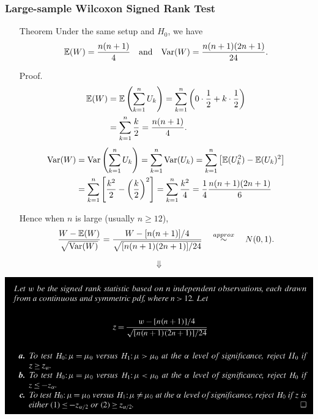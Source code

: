 \begin{frame}[fragile]
	\frametitle{Large-sample Wilcoxon Signed Rank Test}
\begin{itemize}
	\item[Theorem] Under the same setup and $H_0$, we have
	\begin{align*}
		\mathbb{E}(W) = \frac{n(n+1)}{4}\quad\text{and}\quad \text{Var}(W)=\frac{n(n+1)(2n+1)}{24}.
	\end{align*}
	\bigskip
	\item[Proof.]
	\begin{align*}
		\mathbb{E}(W) & = \mathbb{E}\left(\sum_{k=1}^n U_k\right) = \sum_{k=1}^n \left(0\cdot \frac{1}{2}+k\cdot \frac{1}{2}\right)\\
          & = \sum_{k=1}^n \frac{k}{2} = \frac{n(n+1)}{4}.
	\end{align*}
	\begin{align*}
		\text{Var}(W) & = \text{Var}\left(\sum_{k=1}^n U_k\right) = \sum_{k=1}^n \text{Var}(U_k) = \sum_{k=1}^n \left[ \mathbb{E}(U_k^2) - \mathbb{E}(U_k)^2\right] \\
            & = \sum_{k=1}^n \left[ \frac{k^2}{2} - \left(\frac{k}{2}\right)^2\right] = \sum_{k=1}^n \frac{k^2}{4} = \frac{1}{4} \frac{n(n+1)(2n+1)}{6}
	\end{align*}
	\myQED
\end{itemize}
\end{frame}
\begin{frame}[fragile]
\begin{itemize}
	\item[Hence] when $n$ is large (usually $n\ge 12$),
	\begin{align*}
		\frac{W-\mathbb{E}(W)}{\sqrt{\text{Var}(W)}} = \frac{W-[n(n+1)]/4}{\sqrt{[n(n+1)(2n+1)]/24}} \quad \stackrel{approx}{\sim}\quad N(0,1).
	\end{align*}
\end{itemize}
\[\Downarrow\]
\begin{center}
	\includegraphics[scale=0.31]{Codes/Theorem14-3-3.png}
\end{center}
\end{frame}
